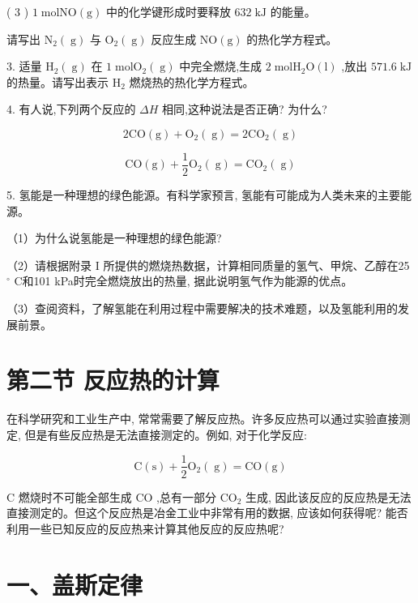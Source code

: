 \documentclass[10pt]{article}
\begin{document}
( 3 ) \(1\mathrm{\;{mol}}\mathrm{{NO}}\left( \mathrm{g}\right)\) 中的化学键形成时要释放 \({632}\mathrm{\;{kJ}}\) 的能量。

请写出 \({\mathrm{N}}_{2}\left( \mathrm{\;g}\right)\) 与 \({\mathrm{O}}_{2}\left( \mathrm{\;g}\right)\) 反应生成 \(\mathrm{{NO}}\left( \mathrm{g}\right)\) 的热化学方程式。

3. 适量 \({\mathrm{H}}_{2}\left( \mathrm{\;g}\right)\) 在 \(1\mathrm{\;{mol}}{\mathrm{O}}_{2}\left( \mathrm{\;g}\right)\) 中完全燃烧,生成 \(2\mathrm{\;{mol}}{\mathrm{H}}_{2}\mathrm{O}\left( \mathrm{l}\right)\) ,放出 \({571.6}\mathrm{\;{kJ}}\) 的热量。请写出表示 \({\mathrm{H}}_{2}\) 燃烧热的热化学方程式。

4. 有人说,下列两个反应的 \({\Delta H}\) 相同,这种说法是否正确? 为什么?

\[
2\mathrm{{CO}}\left( \mathrm{g}\right) + {\mathrm{O}}_{2}\left( \mathrm{\;g}\right) = 2{\mathrm{{CO}}}_{2}\left( \mathrm{\;g}\right)
\]

\[
\mathrm{{CO}}\left( \mathrm{g}\right) + \frac{1}{2}{\mathrm{O}}_{2}\left( \mathrm{\;g}\right) = {\mathrm{{CO}}}_{2}\left( \mathrm{\;g}\right)
\]

5. 氢能是一种理想的绿色能源。有科学家预言, 氢能有可能成为人类未来的主要能源。

（1）为什么说氢能是一种理想的绿色能源?

（2）请根据附录 I 所提供的燃烧热数据，计算相同质量的氢气、甲烷、乙醇在25 \({}^{ \circ }\) C和101 kPa时完全燃烧放出的热量, 据此说明氢气作为能源的优点。

（3）查阅资料，了解氢能在利用过程中需要解决的技术难题，以及氢能利用的发展前景。

\section*{第二节 反应热的计算}

在科学研究和工业生产中, 常常需要了解反应热。许多反应热可以通过实验直接测定, 但是有些反应热是无法直接测定的。例如, 对于化学反应:

\[
\mathrm{C}\left( \mathrm{s}\right) + \frac{1}{2}{\mathrm{O}}_{2}\left( \mathrm{\;g}\right) = \mathrm{{CO}}\left( \mathrm{g}\right)
\]

\(\mathrm{C}\) 燃烧时不可能全部生成 \(\mathrm{{CO}}\) ,总有一部分 \({\mathrm{{CO}}}_{2}\) 生成, 因此该反应的反应热是无法直接测定的。但这个反应热是冶金工业中非常有用的数据, 应该如何获得呢? 能否利用一些已知反应的反应热来计算其他反应的反应热呢?

\section*{一、盖斯定律}
\end{document}
